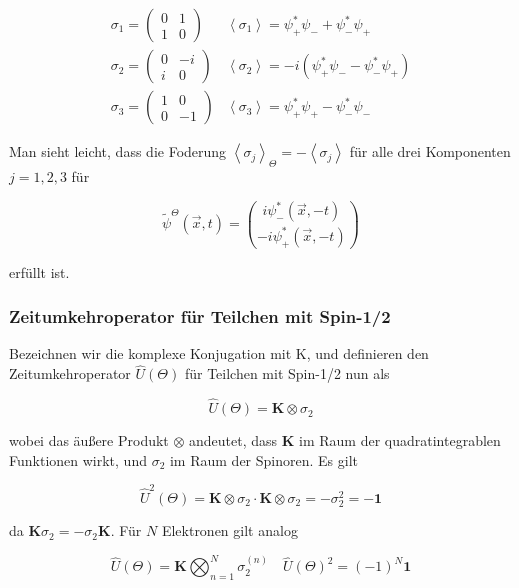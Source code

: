 \documentclass[10pt, letterpaper]{article}
\begin{document}
$$
\begin{array}{ll}
\sigma_{1}=\left(\begin{array}{cc}
0 & 1 \\
1 & 0
\end{array}\right) & \left\langle\sigma_{1}\right\rangle=\psi_{+}^{*} \psi_{-}+\psi_{-}^{*} \psi_{+} \\
\sigma_{2}=\left(\begin{array}{cc}
0 & -i \\
i & 0
\end{array}\right) & \left\langle\sigma_{2}\right\rangle=-i\left(\psi_{+}^{*} \psi_{-}-\psi_{-}^{*} \psi_{+}\right) \\
\sigma_{3}=\left(\begin{array}{cc}
1 & 0 \\
0 & -1
\end{array}\right) & \left\langle\sigma_{3}\right\rangle=\psi_{+}^{*} \psi_{+}-\psi_{-}^{*} \psi_{-}
\end{array}
$$

Man sieht leicht, dass die Foderung $\left\langle\sigma_{j}\right\rangle_{\Theta}=-\left\langle\sigma_{j}\right\rangle$ für alle drei Komponenten $j=1,2,3$ für

$$
\widetilde{\psi}^{\Theta}(\vec{x}, t)=\binom{i \psi_{-}^{*}(\vec{x},-t)}{-i \psi_{+}^{*}(\vec{x},-t)}
$$

erfüllt ist.

\subsubsection*{Zeitumkehroperator für Teilchen mit Spin-1/2}
Bezeichnen wir die komplexe Konjugation mit K, und definieren den Zeitumkehroperator $\widehat{U}(\Theta)$ für Teilchen mit Spin-1/2 nun als

$$
\widehat{U}(\Theta)=\mathbf{K} \otimes \sigma_{2}
$$

wobei das äußere Produkt $\otimes$ andeutet, dass $\mathbf{K}$ im Raum der quadratintegrablen Funktionen wirkt, und $\sigma_{2}$ im Raum der Spinoren. Es gilt

$$
\widehat{U}^{2}(\Theta)=\mathbf{K} \otimes \sigma_{2} \cdot \mathbf{K} \otimes \sigma_{2}=-\sigma_{2}^{2}=-\mathbf{1}
$$

da $\mathbf{K} \sigma_{2}=-\sigma_{2} \mathbf{K}$. Für $N$ Elektronen gilt analog

$$
\widehat{U}(\Theta)=\mathbf{K} \bigotimes_{n=1}^{N} \sigma_{2}^{(n)} \quad \widehat{U}(\Theta)^{2}=(-1)^{N} \mathbf{1}
$$
\end{document}
